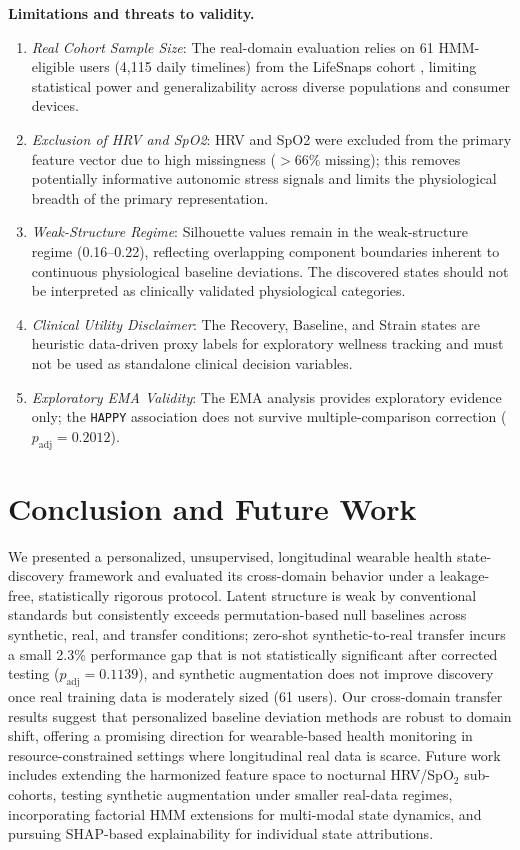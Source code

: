 \documentclass[conference]{IEEEtran}
\begin{document}
\textbf{Limitations and threats to validity.}
\begin{enumerate}
\item \textit{Real Cohort Sample Size}: The real-domain evaluation relies on 61 HMM-eligible users (4,115 daily timelines) from the LifeSnaps cohort \cite{b15}, limiting statistical power and generalizability across diverse populations and consumer devices.
\item \textit{Exclusion of HRV and SpO2}: HRV and SpO2 were excluded from the primary feature vector due to high missingness ($>66\%$ missing); this removes potentially informative autonomic stress signals and limits the physiological breadth of the primary representation.
\item \textit{Weak-Structure Regime}: Silhouette values remain in the weak-structure regime (0.16--0.22), reflecting overlapping component boundaries inherent to continuous physiological baseline deviations. The discovered states should not be interpreted as clinically validated physiological categories.
\item \textit{Clinical Utility Disclaimer}: The Recovery, Baseline, and Strain states are heuristic data-driven proxy labels for exploratory wellness tracking and must not be used as standalone clinical decision variables.
\item \textit{Exploratory EMA Validity}: The EMA analysis provides exploratory evidence only; the \texttt{HAPPY} association does not survive multiple-comparison correction ($p_{\text{adj}} = 0.2012$).
\end{enumerate}

\section{Conclusion and Future Work}

We presented a personalized, unsupervised, longitudinal wearable health state-discovery framework and evaluated its cross-domain behavior under a leakage-free, statistically rigorous protocol. Latent structure is weak by conventional standards but consistently exceeds permutation-based null baselines across synthetic, real, and transfer conditions; zero-shot synthetic-to-real transfer incurs a small 2.3\% performance gap that is not statistically significant after corrected testing ($p_{\text{adj}} = 0.1139$), and synthetic augmentation does not improve discovery once real training data is moderately sized (61 users). Our cross-domain transfer results suggest that personalized baseline deviation methods are robust to domain shift, offering a promising direction for wearable-based health monitoring in resource-constrained settings where longitudinal real data is scarce. Future work includes extending the harmonized feature space to nocturnal HRV/SpO$_2$ sub-cohorts, testing synthetic augmentation under smaller real-data regimes, incorporating factorial HMM extensions \cite{b13} for multi-modal state dynamics, and pursuing SHAP-based explainability \cite{b12} for individual state attributions.
\end{document}
